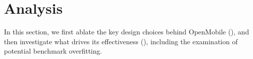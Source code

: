 \documentclass{article} %
\newcommand{\cmark}{\textcolor[HTML]{2E8B57}{\ding{51}}}
\newcommand{\xmark}{\textcolor[HTML]{C0392B}{\ding{55}}}
\begin{document}

\section{Analysis}

In this section, we first ablate the key design choices behind OpenMobile (), and then investigate what drives its effectiveness (), including the examination of potential benchmark overfitting.
\end{document}
